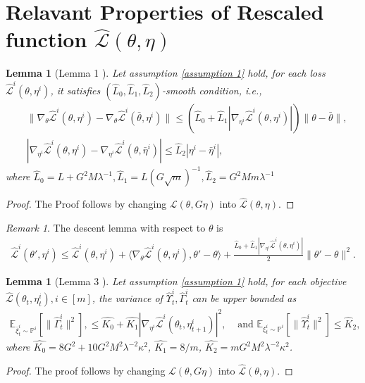 \documentclass[twoside]{article} %
\theoremstyle{plain}
\newtheorem{lemma}[theorem]{Lemma}
\theoremstyle{definition}
\theoremstyle{remark}
\newtheorem{remark}[theorem]{Remark}
\newcommand{\HGamma}{\hat{\Gamma}}
\newcommand{\HUpsilon}{\hat{\Upsilon}}
\newcommand{\hL}{\hat{L}}
\newcommand{\fL}{\mathcal{L}}
\newcommand{\fhL}{\hat{\mathcal{L}}}
\begin{document}
\section{Relavant Properties of Rescaled function $\fhL(\theta,\eta)$}\label{sec: property of hat L}
\begin{lemma}[Lemma 1 \citep{qirevistfDRO}]\label{lemma: generalized-smooth}
Let assumption \ref{assumption 1} hold, for each loss $\fhL^i(\theta, \eta^i)$, it satisfies $(\hL_0, \hL_1,\hL_2)$-smooth condition, i.e.,
\begin{align}
&\|\nabla_{\theta} {\fhL}^i({\theta}, \eta^i)-\nabla_{\theta} {\fhL}^i(\bar{\theta}, \eta^i)\|  \leq (\hL_0+\hL_1|\nabla_{\eta^i} {\fhL}^i({\theta}, \eta^i)|)\|{\theta}-\bar{\theta}\|, \nonumber\\
&|\nabla_{\eta^i} {\fhL}^i({\theta}, \eta^i)-\nabla_{\eta^i} {\fhL}^i({\theta}, \bar{\eta}^{i})| \leq \hL_2|\eta^i-\bar{\eta}^{i}|,
\end{align}
where $\hL_0=L+{G^2M}{\lambda}^{-1}, \hL_1={L}{(G\sqrt{m})^{-1}}, \hL_2 = {G^2Mm}{\lambda}^{-1}$
\end{lemma}
\begin{proof}
    The Proof follows \citet{qirevistfDRO} by changing $\fL(\theta, G\eta)$ into $\fhL(\theta,\eta)$. 
\end{proof}
\begin{remark}
The descent lemma with respect to $\theta$ is
\begin{align}
    {\fhL}^i({\theta}', \eta^i) \leq {\fhL}^i({\theta}, \eta^i)+\langle\nabla_{{\theta}} {\fhL}^i({\theta}, \eta^i), {\theta}'-{\theta}\rangle+\frac{\hL_0+\hL_1|\nabla_{\eta^i} {\fhL^i}({\theta}, \eta^i)|}{2}\|{\theta}'-{\theta}\|^2.
    \label{eq: single-objective descent lemma}
\end{align}
\end{remark}
\begin{lemma}[Lemma 3 \citep{qirevistfDRO}]\label{lemma: affine bounded noise}
Let assumption \ref{assumption 1} hold, for each objective $\fhL(\theta_t,\eta_t^i),i\in[m]$, the variance of $\HUpsilon_t^i, \HGamma_t^i$ can be upper bounded as
\begin{align}
    \mathbb{E}_{\bar{\xi}^{i}_{t}\sim \mathbb{P}^i}[\|\HGamma_t^{i} \|^2],\leq \hat{K_0}+\hat{K_1}|\nabla_{\eta^i}\fhL^i({\theta}_t, \eta_{t+1}^i)|^2,
    &\text{ and }\mathbb{E}_{\xi^{i}_{t}\sim \mathbb{P}^i}[\|\HUpsilon_{t}^{i} \|^2 ]\leq \hat{K}_2,
    \label{eq: variance bound for rescaled function}
\end{align}
where $\hat{K_0}=8G^2+10G^2M^2\lambda^{-2}\kappa^2$, $\hat{K_1} = 8/m$, $\hat{K_2} = mG^2 M^2 \lambda^{-2} \kappa^2$.
\end{lemma}
\begin{proof}
    The proof follows \citet{qirevistfDRO} by changing $\fL(\theta,G\eta)$ into $\fhL(\theta,\eta)$.
\end{proof}
\end{document}
